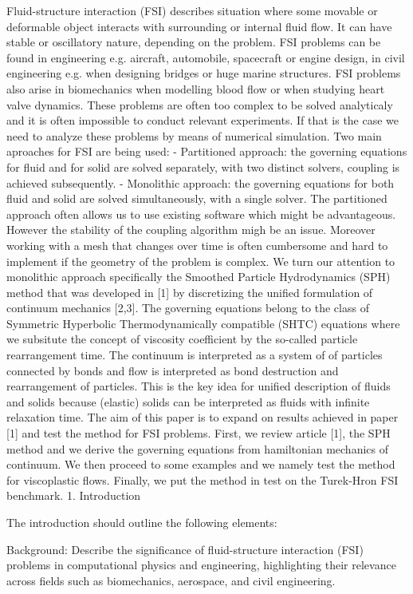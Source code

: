 Fluid-structure interaction (FSI) describes situation where some movable or deformable object interacts with surrounding or internal fluid flow. 
It can have stable or oscillatory nature, depending on the problem. FSI problems can be found in engineering e.g. aircraft, automobile, spacecraft or engine design,
in civil engineering e.g. when designing bridges or huge marine structures. FSI problems also arise in biomechanics when modelling blood flow or when studying heart
valve dynamics.
These problems are often too complex to be solved analyticaly and it is often impossible to conduct relevant experiments. 
If that is the case we need to analyze these problems by means of numerical simulation. Two main aproaches for FSI are being used:
 - Partitioned approach: the governing equations for fluid and for solid are solved separately, with two distinct solvers, coupling is achieved subsequently.
 - Monolithic approach: the governing equations for both fluid and solid are solved simultaneously, with a single solver.
The partitioned approach often allows us to use existing software which might be advantageous. However the stability of the coupling algorithm migh be an issue. 
Moreover working with a mesh that changes over time is often cumbersome and hard to implement if the geometry of the problem is complex.
We turn our attention to monolithic approach specifically the Smoothed Particle Hydrodynamics (SPH) method that was developed in [1] by discretizing the unified formulation of continuum mechanics [2,3].
The governing equations belong to the class of Symmetric Hyperbolic Thermodynamically compatible (SHTC) equations where we subsitute the concept of viscosity coefficient by the so-called
particle rearrangement time. The continuum is interpreted as a system of of particles connected by bonds and flow is interpreted as bond destruction and rearrangement of particles. 
This is the key idea for unified description of fluids and solids because (elastic) solids can be interpreted as fluids with infinite relaxation time.
The aim of this paper is to expand on results achieved in paper [1] and test the method for FSI problems. First, we review article [1], the SPH method and we derive the governing equations
from hamiltonian mechanics of continuum. We then proceed to some examples and we namely test the method for viscoplastic flows. Finally, we put the method in test on the Turek-Hron FSI benchmark.
1. Introduction

The introduction should outline the following elements:

    Background: Describe the significance of fluid-structure interaction (FSI) problems in computational physics and engineering,
    highlighting their relevance across fields such as biomechanics, aerospace, and civil engineering.

